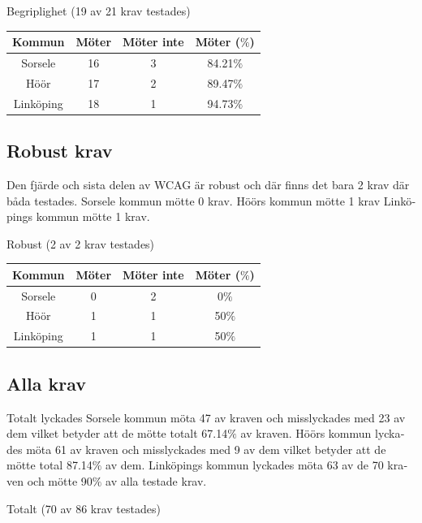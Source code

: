 \documentclass[11p]{article}
\begin{document}
\begin{otherlanguage}{swedish}
    \begin{center}
    Begriplighet (19 av 21 krav testades)

    \begin{tabular}{ |c|c|c|c|}
        \hline
        Kommun & Möter & Möter inte & Möter ($\%$) \\  \hline
        Sorsele & 16 & 3 & 84.21$\%$ \\ \hline
        Höör & 17 & 2 & 89.47$\%$ \\ \hline
        Linköping & 18 & 1 & 94.73$\%$ \\ \hline
    \end{tabular}
    \end{center}

    \subsection{Robust krav}
    Den fjärde och sista delen av WCAG är robust och där finns det bara 2 krav där båda testades.
    Sorsele kommun mötte 0 krav.
    Höörs kommun mötte 1 krav
    Linköpings kommun mötte 1 krav.

    \begin{center}
    Robust (2 av 2 krav testades)

    \begin{tabular}{ |c|c|c|c|}
        \hline
        Kommun & Möter & Möter inte & Möter ($\%$) \\  \hline
        Sorsele & 0 & 2 & 0$\%$ \\ \hline
        Höör & 1 & 1 & 50$\%$ \\ \hline
        Linköping & 1 & 1 & 50$\%$ \\ \hline
    \end{tabular}
    \end{center}
    
    \subsection{Alla krav}
    Totalt lyckades Sorsele kommun möta 47 av kraven och misslyckades med 23 av dem vilket betyder att de mötte totalt 67.14$\%$ av kraven.
    Höörs kommun lyckades möta 61 av kraven och misslyckades med 9 av dem vilket betyder att de mötte total 87.14$\%$ av dem.
    Linköpings kommun lyckades möta 63 av de 70 kraven och mötte 90$\%$ av alla testade krav.

    \begin{center}
    Totalt (70 av 86 krav testades)


\end{center}
\end{otherlanguage}
\end{document}
